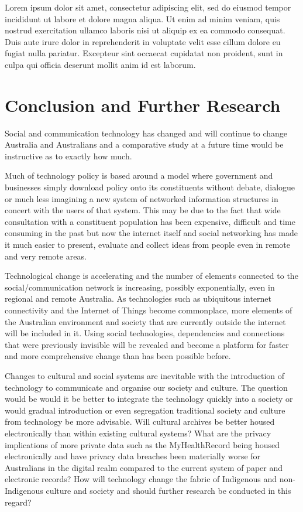 \begin{savequote}[10cm] %
\sffamily
Lorem ipsum dolor sit amet, consectetur adipiscing elit, sed do eiusmod tempor incididunt ut labore et dolore magna aliqua. Ut enim ad minim veniam, quis nostrud exercitation ullamco laboris nisi ut aliquip ex ea commodo consequat. Duis aute irure dolor in reprehenderit in voluptate velit esse cillum dolore eu fugiat nulla pariatur. Excepteur sint occaecat cupidatat non proident, sunt in culpa qui officia deserunt mollit anim id est laborum.
\end{savequote}


\chapter{Conclusion and Further Research}

Social and communication technology has changed and will continue to change Australia and Australians and a comparative study at a future time would be instructive as to exactly how much.

Much of technology policy is based around a model where government and businesses simply download policy onto its constituents without debate, dialogue or much less imagining a new system of networked information structures in concert with the users of that system. This may be due to the fact that wide consultation with a constituent population has been expensive, difficult and time consuming in the past but now the internet itself and social networking has made it much easier to present, evaluate and collect ideas from people even in remote and very remote areas.

Technological change is accelerating and the number of elements connected to the social/communication network is increasing, possibly exponentially, even in regional and remote Australia. As technologies such as ubiquitous internet connectivity and the Internet of Things become commonplace, more elements of the Australian environment and society that are currently outside the internet will be included in it. Using social technologies, dependencies and connections that were previously invisible will be revealed and become a platform for faster and more comprehensive change than has been possible before. 



Changes to cultural and social systems are inevitable with the introduction of technology to communicate and organise our society and culture. The question would be would it be better to integrate the technology quickly into a society or would gradual introduction or even segregation traditional society and culture from technology be more advisable. Will cultural archives be better housed electronically than within existing cultural systems? What are the privacy implications of more private data such as the MyHealthRecord being housed electronically and have privacy data breaches been materially worse for Australians in the digital realm compared to the current system of paper and electronic records? How will technology change the fabric of Indigenous and non-Indigenous culture and society and should further research be conducted in this regard?


